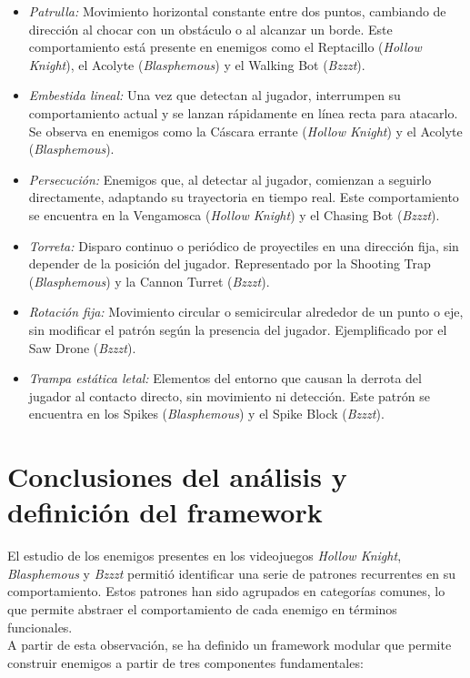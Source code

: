 \begin{itemize}
	\item \emph{Patrulla:} Movimiento horizontal constante entre dos puntos, cambiando de dirección al chocar con un obstáculo o al alcanzar un borde. Este comportamiento está presente en enemigos como el Reptacillo (\textit{Hollow Knight}), el Acolyte (\textit{Blasphemous}) y el Walking Bot (\textit{Bzzzt}).
	\item \emph{Embestida lineal:} Una vez que detectan al jugador, interrumpen su comportamiento actual y se lanzan rápidamente en línea recta para atacarlo. Se observa en enemigos como la Cáscara errante (\textit{Hollow Knight}) y el Acolyte (\textit{Blasphemous}).
	\item \emph{Persecución:} Enemigos que, al detectar al jugador, comienzan a seguirlo directamente, adaptando su trayectoria en tiempo real. Este comportamiento se encuentra en la Vengamosca (\textit{Hollow Knight}) y el Chasing Bot (\textit{Bzzzt}).
	\item \emph{Torreta:} Disparo continuo o periódico de proyectiles en una dirección fija, sin depender de la posición del jugador. Representado por la Shooting Trap (\textit{Blasphemous}) y la Cannon Turret (\textit{Bzzzt}).
	\item \emph{Rotación fija:} Movimiento circular o semicircular alrededor de un punto o eje, sin modificar el patrón según la presencia del jugador. Ejemplificado por el Saw Drone (\textit{Bzzzt}).
	\item \emph{Trampa estática letal:} Elementos del entorno que causan la derrota del jugador al contacto directo, sin movimiento ni detección. Este patrón se encuentra en los Spikes (\textit{Blasphemous}) y el Spike Block (\textit{Bzzzt}).
\end{itemize}

\section{Conclusiones del análisis y definición del framework}

El estudio de los enemigos presentes en los videojuegos \textit{Hollow Knight}, \textit{Blasphemous} y \textit{Bzzzt} permitió identificar una serie de patrones recurrentes en su comportamiento. Estos patrones han sido agrupados en categorías comunes, lo que permite abstraer el comportamiento de cada enemigo en términos funcionales.\\

A partir de esta observación, se ha definido un framework modular que permite construir enemigos a partir de tres componentes fundamentales:

